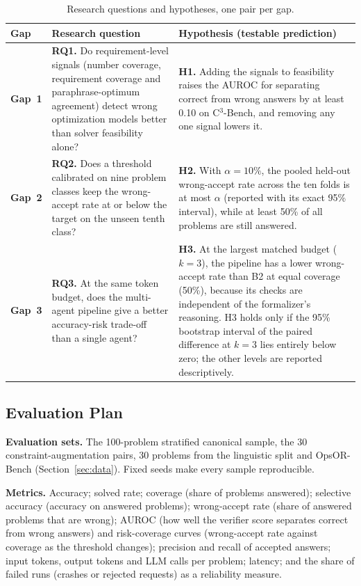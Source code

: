 \documentclass[11pt,a4paper]{article}
\newcommand{\cthree}{C$^3$-Bench}
\begin{document}
\begin{table}[htbp]
\centering
\caption{Research questions and hypotheses, one pair per gap.}
\label{tab:rq}
\small
\begin{tabularx}{\textwidth}{@{}P{1.2cm}YY@{}}
\toprule
\textbf{Gap} & \textbf{Research question} & \textbf{Hypothesis (testable prediction)}\\
\midrule
\textcolor{gapone}{\textbf{Gap~1}} & \textbf{RQ1.} Do requirement-level signals (number coverage, requirement coverage and paraphrase-optimum agreement) detect wrong optimization models better than solver feasibility alone? & \textbf{H1.} Adding the signals to feasibility raises the AUROC for separating correct from wrong answers by at least 0.10 on \cthree, and removing any one signal lowers it.\\
\midrule
\textcolor{gaptwo}{\textbf{Gap~2}} & \textbf{RQ2.} Does a threshold calibrated on nine problem classes keep the wrong-accept rate at or below the target on the unseen tenth class? & \textbf{H2.} With $\alpha = 10\%$, the pooled held-out wrong-accept rate across the ten folds is at most $\alpha$ (reported with its exact 95\% interval), while at least 50\% of all problems are still answered.\\
\midrule
\textcolor{gapthree}{\textbf{Gap~3}} & \textbf{RQ3.} At the same token budget, does the multi-agent pipeline give a better accuracy-risk trade-off than a single agent? & \textbf{H3.} At the largest matched budget ($k = 3$), the pipeline has a lower wrong-accept rate than B2 at equal coverage (50\%), because its checks are independent of the formalizer's reasoning. H3 holds only if the 95\% bootstrap interval of the paired difference at $k = 3$ lies entirely below zero; the other levels are reported descriptively.\\
\bottomrule
\end{tabularx}
\end{table}

\subsection{Evaluation Plan}
\label{sec:evalplan}

\textbf{Evaluation sets.} The 100-problem stratified canonical sample, the 30 constraint-augmentation pairs, 30 problems from the linguistic split and OpsOR-Bench (Section~\ref{sec:data}). Fixed seeds make every sample reproducible.

\textbf{Metrics.} Accuracy; solved rate; coverage (share of problems answered); selective accuracy (accuracy on answered problems); wrong-accept rate (share of answered problems that are wrong); AUROC (how well the verifier score separates correct from wrong answers) and risk-coverage curves (wrong-accept rate against coverage as the threshold changes); precision and recall of accepted answers; input tokens, output tokens and LLM calls per problem; latency; and the share of failed runs (crashes or rejected requests) as a reliability measure.
\end{document}
